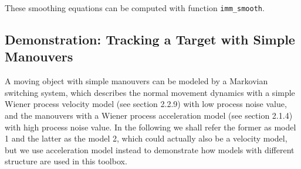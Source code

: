 These smoothing equations can be computed with function
\texttt{imm\_smooth}.

\subsection{Demonstration: Tracking a Target with Simple Manouvers}

A moving object with simple manouvers can be modeled by a Markovian
switching system, which describes the normal movement dynamics with a
simple Wiener process velocity model (see section 2.2.9) with low
process noise value, and the manouvers with a Wiener process
acceleration model (see section 2.1.4) with high process noise
value. In the following we shall refer the former as model 1 and the
latter as the model 2, which could actually also be a velocity model,
but we use acceleration model instead to demonstrate how models with
different structure are used in this toolbox.

